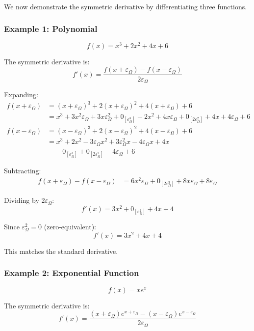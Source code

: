\documentclass{article}
\begin{document}
We now demonstrate the symmetric derivative by differentiating three functions.

\subsubsection{Example 1: Polynomial}

$$f(x) = x^3 + 2x^2 + 4x + 6$$

The symmetric derivative is:
$$f'(x) = \frac{f(x + \varepsilon_\Omega) - f(x - \varepsilon_\Omega)}{2\varepsilon_\Omega}$$

Expanding:
\begin{align*}
f(x + \varepsilon_\Omega) &= (x + \varepsilon_\Omega)^3 + 2(x + \varepsilon_\Omega)^2 + 4(x + \varepsilon_\Omega) + 6 \\
&= x^3 + 3x^2\varepsilon_\Omega + 3x\varepsilon_\Omega^2 + 0_{[\varepsilon_\Omega^3]} + 2x^2 + 4x\varepsilon_\Omega + 0_{[2\varepsilon_\Omega^2]} + 4x + 4\varepsilon_\Omega + 6
\\
f(x - \varepsilon_\Omega) &= (x - \varepsilon_\Omega)^3 + 2(x - \varepsilon_\Omega)^2 + 4(x - \varepsilon_\Omega) + 6 \\
&= x^3 
+ 2x^2  - 3\varepsilon_\Omega x^2 
+ 3\varepsilon_\Omega^2x - 4\varepsilon_\Omega x + 4x \\
&\quad - 0_{[\varepsilon_\Omega^3]} + 0_{[2\varepsilon_\Omega^2]} - 4\varepsilon_\Omega + 6
\end{align*}

Subtracting:
\begin{align*}
f(x + \varepsilon_\Omega) - f(x - \varepsilon_\Omega) &= 6x^2\varepsilon_\Omega + 0_{[2\varepsilon_\Omega^3]}  + 8x\varepsilon_\Omega + 8\varepsilon_\Omega
\end{align*}

Dividing by $2\varepsilon_\Omega$:
$$f'(x) = 3x^2 + 0_{[\varepsilon_\Omega^2]} + 4x + 4$$

Since $\varepsilon_\Omega^2 = 0$ (zero-equivalent):
$$f'(x) = 3x^2 + 4x + 4$$

This matches the standard derivative.

\subsubsection{Example 2: Exponential Function}

$$f(x) = xe^x$$

The symmetric derivative is:
$$f'(x) = \frac{(x + \varepsilon_\Omega)e^{x + \varepsilon_\Omega} - (x - \varepsilon_\Omega)e^{x - \varepsilon_\Omega}}{2\varepsilon_\Omega}$$
\end{document}
